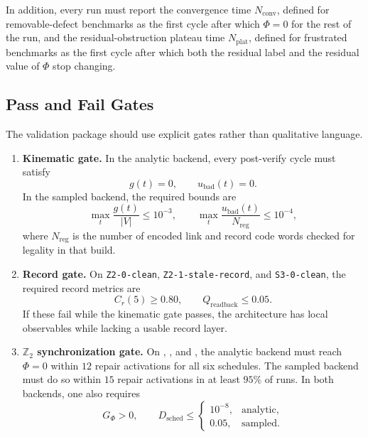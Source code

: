 \documentclass[11pt]{article}
\begin{document}
In addition, every run must report the convergence time $N_{\mathrm{conv}}$, defined for
removable-defect benchmarks as the first cycle after which $\Phi=0$ for the rest of the run, and
the residual-obstruction plateau time $N_{\mathrm{plat}}$, defined for frustrated benchmarks as
the first cycle after which both the residual label and the residual value of $\Phi$ stop
changing.

\subsection{Pass and Fail Gates}

The validation package should use explicit gates rather than qualitative language.
\begin{enumerate}[leftmargin=2em]
\item \textbf{Kinematic gate.}
In the analytic backend, every post-verify cycle must satisfy
\begin{equation}
g(t)=0,
\qquad
u_{\mathrm{bad}}(t)=0.
\end{equation}
In the sampled backend, the required bounds are
\begin{equation}
\max_t \frac{g(t)}{|V|}\le 10^{-3},
\qquad
\max_t \frac{u_{\mathrm{bad}}(t)}{N_{\mathrm{reg}}}\le 10^{-4},
\end{equation}
where $N_{\mathrm{reg}}$ is the number of encoded link and record code words checked for
legality in that build.
\item \textbf{Record gate.}
On \texttt{Z2-0-clean}, \texttt{Z2-1-stale-record}, and \texttt{S3-0-clean}, the required record
metrics are
\begin{equation}
C_r(5)\ge 0.80,
\qquad
Q_{\mathrm{readback}}\le 0.05.
\end{equation}
If these fail while the kinematic gate passes, the architecture has local observables while
lacking a usable record layer.
\item \textbf{$\mathbb Z_2$ synchronization gate.}
On , , and , the
analytic backend must reach $\Phi=0$ within $12$ repair activations for all six schedules. The
sampled backend must do so within $15$ repair activations in at least $95\%$ of runs. In both
backends, one also requires
\begin{equation}
G_{\Phi}>0,
\qquad
D_{\mathrm{sched}}\le
\begin{cases}
10^{-8}, & \text{analytic},\\
0.05, & \text{sampled}.
\end{cases}

\end{equation}
\end{enumerate}
\end{document}
